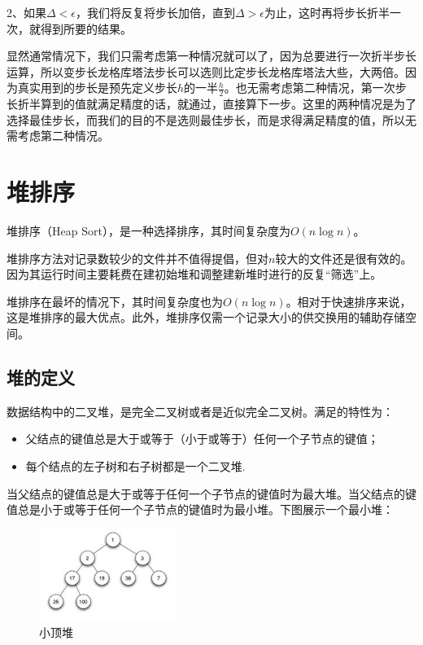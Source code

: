 2、如果$\Delta < \epsilon$，我们将反复将步长加倍，直到$\Delta > \epsilon$为止，这时再将步长折半一次，就得到所要的结果。

显然通常情况下，我们只需考虑第一种情况就可以了，因为总要进行一次折半步长运算，所以变步长龙格库塔法步长可以选则比定步长龙格库塔法大些，大两倍。因为真实用到的步长是预先定义步长$h$的一半$\frac{h}{2}$。也无需考虑第二种情况，第一次步长折半算到的值就满足精度的话，就通过，直接算下一步。这里的两种情况是为了选择最佳步长，而我们的目的不是选则最佳步长，而是求得满足精度的值，所以无需考虑第二种情况。






\chapter{堆排序}

堆排序（Heap Sort），是一种选择排序，其时间复杂度为$O(n\log n)$。

堆排序方法对记录数较少的文件并不值得提倡，但对$n$较大的文件还是很有效的。因为其运行时间主要耗费在建初始堆和调整建新堆时进行的反复“筛选”上。

堆排序在最坏的情况下，其时间复杂度也为$O(n\log n)$。相对于快速排序来说，这是堆排序的最大优点。此外，堆排序仅需一个记录大小的供交换用的辅助存储空间。


\section{堆的定义}
数据结构中的二叉堆，是完全二叉树或者是近似完全二叉树。满足的特性为：
\begin{itemize}
\item 父结点的键值总是大于或等于（小于或等于）任何一个子节点的键值；
\item 每个结点的左子树和右子树都是一个二叉堆.
\end{itemize}
当父结点的键值总是大于或等于任何一个子节点的键值时为最大堆。当父结点的键值总是小于或等于任何一个子节点的键值时为最小堆。下图展示一个最小堆：

\begin{figure}[h]
\begin{center}
\includegraphics[width=0.4\textwidth]{pictures/heap.png}
\end{center}
\caption{小顶堆}
\end{figure}

